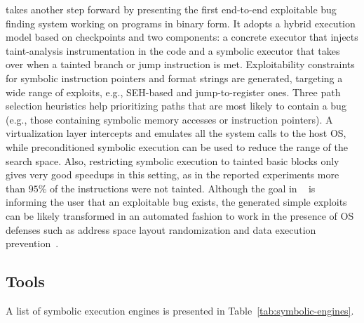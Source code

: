 \cite{MAYHEM-SP12} takes another step forward by presenting the first end-to-end exploitable bug finding system working on programs in binary form. It adopts a hybrid execution model based on checkpoints and two components: a concrete executor that injects taint-analysis instrumentation in the code and a symbolic executor that takes over when a tainted branch or jump instruction is met. Exploitability constraints for symbolic instruction pointers and format strings are generated, targeting a wide range of exploits, e.g., SEH-based and jump-to-register ones. Three path selection heuristics help prioritizing paths that are most likely to contain a bug (e.g., those containing symbolic memory accesses or instruction pointers). A virtualization layer intercepts and emulates all the system calls to the host OS, while preconditioned symbolic execution can be used to reduce the range of the search space. Also, restricting symbolic execution to tainted basic blocks only gives very good speedups in this setting, as in the reported experiments more than $95\%$ of the instructions were not tainted. Although the goal in ~\cite{MAYHEM-SP12} is informing the user that an exploitable bug exists, the generated simple exploits can be likely transformed in an automated fashion to work in the presence of OS defenses such as address space layout randomization and data execution prevention~\cite{Q-SEC11}. 


\subsection{Tools}
A list of symbolic execution engines is presented in Table~\ref{tab:symbolic-engines}.

